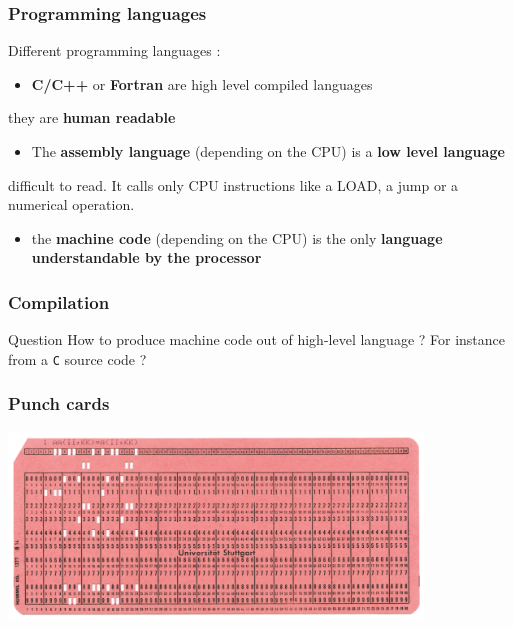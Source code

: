 \begin{frame}
\frametitle{Programming languages}

Different programming languages :

\begin{itemize}
	\item {\bf C/C++} or {\bf Fortran} are high level compiled languages
\end{itemize}

they are {\bf human readable} %

\begin{itemize}
	\item The {\bf assembly language} (depending on the CPU) is a {\bf low level language}
\end{itemize}

difficult to read. It calls only CPU instructions like a LOAD, a jump or a numerical operation.

\begin{itemize}
	\item the {\bf machine code} (depending on the CPU) is the only {\bf language understandable by the processor}
\end{itemize}

\end{frame}

\begin{frame}
\frametitle{Compilation}
\begin{alertblock}{Question}
How to produce machine code out of high-level language ? For instance from a {\tt C} source code ?
\end{alertblock}
\end{frame}

\begin{frame}
\frametitle{Punch cards}
\begin{center}
{\includegraphics[width=11cm]{Day2/images/punch-card.jpg}}
\end{center}
\end{frame}

